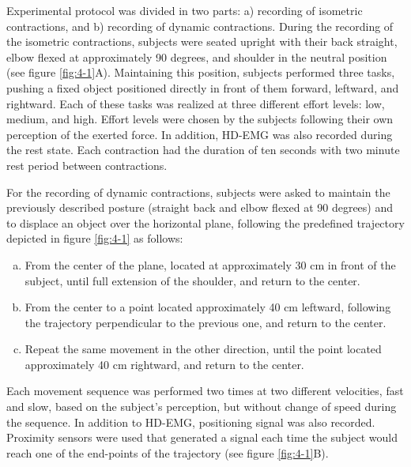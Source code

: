 Experimental protocol was divided in two parts: a) recording of isometric contractions, and b) recording of dynamic contractions.
During the recording of the isometric contractions, subjects were seated upright with their back straight, elbow flexed at approximately 90 degrees, and shoulder in the neutral position (see figure \ref{fig:4-1}A). Maintaining this position, subjects performed three tasks, pushing a fixed object positioned directly in front of them forward, leftward, and rightward. Each of these tasks was realized at three different effort levels: low, medium, and high. Effort levels were chosen by the subjects following their own perception of the exerted force. In addition, HD-EMG was also recorded during the rest state. Each contraction had the duration of ten seconds with two minute rest period between contractions.

For the recording of dynamic contractions, subjects were asked to maintain the previously described posture (straight back and elbow flexed at 90 degrees) and to displace an object over the horizontal plane, following the predefined trajectory depicted in figure \ref{fig:4-1} as follows:

\begin{enumerate}[a)]
\item From the center of the plane, located at approximately 30 cm in front of the subject, until full extension of the shoulder, and return to the center.
\item From the center to a point located approximately 40 cm leftward, following the trajectory perpendicular to the previous one, and return to the center.
\item Repeat the same movement in the other direction, until the point located approximately 40 cm rightward, and return to the center.
\end{enumerate}

Each movement sequence was performed two times at two different velocities, fast and slow, based on the subject's perception, but without change of speed during the sequence. In addition to HD-EMG, positioning signal was also recorded. Proximity sensors were used that generated a signal each time the subject would reach one of the end-points of the trajectory (see figure \ref{fig:4-1}B).

